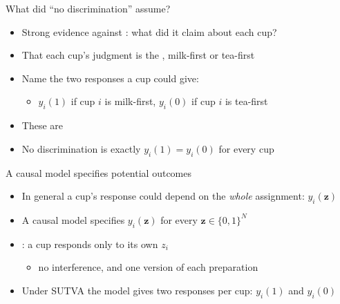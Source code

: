 \documentclass[table, xcolor = {dvipsnames}, 9pt]{beamer}
\theoremstyle{plain}
\newcommand{\mh}[1]{{\color{magenta}{#1}}}
\begin{document}
\begin{frame}{What did ``no discrimination'' assume?}
\vfill
\begin{itemize} \vfill
\item Strong evidence against \mh{no discrimination}: what did it claim about each cup? \vfill
\item That each cup's judgment is the \mh{same}, milk-first or tea-first \vfill
\item Name the two responses a cup could give: \vfill
\begin{itemize} \vfill
\item $y_i(1)$ if cup $i$ is milk-first, \quad $y_i(0)$ if cup $i$ is tea-first \vfill
\end{itemize} \vfill
\item These are \mh{potential outcomes} \citep{neyman1923,rubin1974} \vfill
\item No discrimination is exactly $y_i(1) = y_i(0)$ for every cup \vfill
\end{itemize} \vfill
\end{frame}
\begin{frame}{A causal model specifies potential outcomes}
\vfill
\begin{itemize} \vfill
\item In general a cup's response could depend on the \emph{whole} assignment: $y_i(\bm{z})$ \vfill
\item A causal model specifies $y_i(\bm{z})$ for every $\bm{z} \in \{0,1\}^N$ \vfill
\item \mh{SUTVA} \citep{cox1958a,rubin1980b,rubin1986}: a cup responds only to its own $z_i$ \vfill
\begin{itemize} \vfill
\item no interference, and one version of each preparation \vfill
\end{itemize} \vfill
\item Under SUTVA the model gives two responses per cup: $y_i(1)$ and $y_i(0)$ \vfill
\end{itemize} \vfill
\end{frame}
\end{document}
